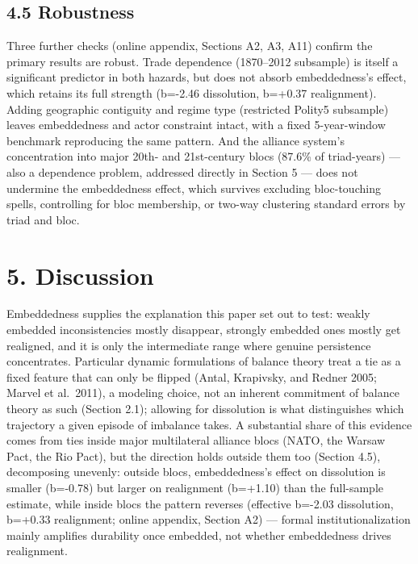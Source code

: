 \documentclass[Afour,sageh,times,doublespace]{sagej}
\begin{document}
\subsection*{4.5 Robustness}

Three further checks (online appendix, Sections A2, A3, A11) confirm the primary results are robust. Trade dependence (1870--2012 subsample) is itself a significant predictor in both hazards, but does not absorb embeddedness's effect, which retains its full strength (b=-2.46 dissolution, b=+0.37 realignment). Adding geographic contiguity and regime type (restricted Polity5 subsample) leaves embeddedness and actor constraint intact, with a fixed 5-year-window benchmark reproducing the same pattern. And the alliance system's concentration into major 20th- and 21st-century blocs (87.6\% of triad-years) --- also a dependence problem, addressed directly in Section 5 --- does not undermine the embeddedness effect, which survives excluding bloc-touching spells, controlling for bloc membership, or two-way clustering standard errors by triad and bloc.

\section*{5. Discussion}

Embeddedness supplies the explanation this paper set out to test: weakly embedded inconsistencies mostly disappear, strongly embedded ones mostly get realigned, and it is only the intermediate range where genuine persistence concentrates. Particular dynamic formulations of balance theory treat a tie as a fixed feature that can only be flipped (Antal, Krapivsky, and Redner 2005; Marvel et al.~2011), a modeling choice, not an inherent commitment of balance theory as such (Section 2.1); allowing for dissolution is what distinguishes which trajectory a given episode of imbalance takes. A substantial share of this evidence comes from ties inside major multilateral alliance blocs (NATO, the Warsaw Pact, the Rio Pact), but the direction holds outside them too (Section 4.5), decomposing unevenly: outside blocs, embeddedness's effect on dissolution is smaller (b=-0.78) but larger on realignment (b=+1.10) than the full-sample estimate, while inside blocs the pattern reverses (effective b=-2.03 dissolution, b=+0.33 realignment; online appendix, Section A2) --- formal institutionalization mainly amplifies durability once embedded, not whether embeddedness drives realignment.
\end{document}
